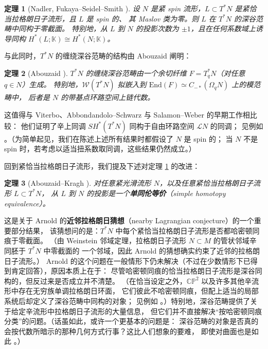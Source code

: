 \documentclass[UTF8,a4paper,11pt,fontset=windows]{ctexart}
\theoremstyle{cnthm}
\newtheorem{thm}{定理}[section]
\numberwithin{equation}{section}
\newcommand{\CP}{\mathbb{CP}}
\newcommand{\KK}{\mathbb{K}}          %
\newcommand{\SH}{SH}                  %
\newcommand{\WW}{\mathcal{W}}         %
\begin{document}
\begin{thm}[Nadler, Fukaya--Seidel--Smith \cite{r75,r47}]\label{thm:2.3}
设 $N$ 是紧 spin 流形，$L\subset T^{*}N$ 是紧恰当拉格朗日子流形，且 $L$ 是 spin 的、
其 Maslov 类为零。则 $L$ 在 $T^{*}N$ 的深谷范畴中同构于零截面。
特别地，从 $L$ 到 $N$ 的投影次数为 $\pm1$，且在任何系数域上诱导同构
$H^{*}(L;\KK)\cong H^{*}(N;\KK)$。
\end{thm}

与此同时，$T^{*}N$ 的缠绕深谷范畴的结构由 Abouzaid 阐明：

\begin{thm}[Abouzaid \cite{r2}]\label{thm:2.4}
$T^{*}N$ 的缠绕深谷范畴由一个余切纤维 $F=T^{*}_qN$（对任意 $q\in N$）生成。
特别地，$\WW(T^{*}N)$ 拟嵌入到 $\mathrm{End}(F)\simeq C_{-*}(\Omega_qN)$ 上的模范畴中，
后者是 $N$ 的带基点环路空间上链代数。
\end{thm}

这值得与 Viterbo、Abbondandolo--Schwarz 与 Salamon--Weber 的早期工作相比较：
他们证明了辛上同调 $\SH^{*}(T^{*}N)$ 同构于自由环路空间 $\mathcal{L}N$ 的同调；
见例如 \cite{r104}。（为简单起见，我们在陈述上述所有结果时都假设了 $N$ 是 spin 的；
当 $N$ 不是 spin 时，若考虑以适当扭系数取同调，这些结果仍然成立。）

回到紧恰当拉格朗日子流形，我们提及下述对定理 \ref{thm:2.3} 的改进：

\begin{thm}[Abouzaid--Kragh \cite{r11}]\label{thm:2.5}
对任意紧光滑流形 $N$，以及任意紧恰当拉格朗日子流形 $L\subset T^{*}N$，
从 $L$ 到 $N$ 的投影是一个\textbf{单同伦等价}（simple homotopy equivalence）。
\end{thm}


这是关于 Arnold 的\textbf{近邻拉格朗日猜想}（nearby Lagrangian conjecture）的一个重要部分结果，
该猜想问的是：$T^{*}N$ 中每个紧恰当拉格朗日子流形是否都哈密顿同痕于零截面。
（由 Weinstein 邻域定理，拉格朗日子流形 $N\subset M$ 的管状邻域辛同胚于 $T^{*}N$ 中零截面的
一个邻域，因此 Arnold 的猜想确实约束了近邻的拉格朗日子流形。）
Arnold 的这个问题在一般情形下仍未解决（不过在少数情形下已得到肯定回答），原因本质上在于：
尽管哈密顿同痕的恰当拉格朗日子流形是深谷同构的，但反过来是否成立并不清楚。
（在恰当设定之外，$\CP^{2}$ 以及许多其他辛流形中存在无穷族单调拉格朗日环面，
它们彼此不哈密顿同痕，但配上适当的局部系统后却定义了深谷范畴中同构的对象；
见例如 \cite{r102}。）特别地，深谷范畴提供了关于给定辛流形中拉格朗日子流形的大量信息，
但它们并不直接解决“按哈密顿同痕分类”的问题。（话虽如此，或许一个更基本的问题是：
深谷范畴的对象是否真的会按代数所暗示的那种几何方式行事？这比人们想象的要难，
即使对曲面也是如此 \cite{r25}。）
\end{document}
